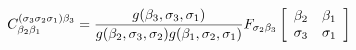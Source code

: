 \begin{equation}
C_{\beta_{2}\beta_{1}}^{(\sigma_{3}\sigma_{2}\sigma_{1})\beta_{3}}=%
\frac{g(\beta_{3},\sigma_{3},\sigma_{1})}{g(\beta_{2},\sigma_{3},\sigma_{2})g(\beta_{1},\sigma_{2},\sigma_{1})}F_{\sigma_{2}\beta_{3}}\left[
\begin{array}
[c]{cc}%
\beta_{2}     & \beta_{1}\\
\sigma_{3}    &   \sigma_{1}%
\end{array}
\right] \label{definition de g}
\end{equation}

